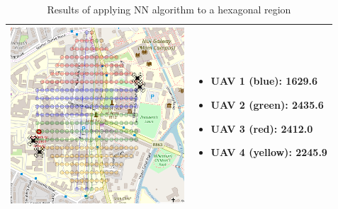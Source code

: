 \begin{table}[h!]
\begin{tabular}{ | c | m{5cm} | }
    \begin{minipage}[c][68mm][c]{.6\textwidth}
      \includegraphics[width=\linewidth, height=66mm]{Chapters/MultiAgentCoverage/MultipleTravellingSalesman/Figs/Hexagon/FourRAV.PNG}
    \end{minipage}
    &
    \begin{itemize}[leftmargin=*]
    \item[] UAV 1 (blue): 1629.6
    \item[] UAV 2 (green): 2435.6
    \item[] UAV 3 (red): 2412.0
    \item[] UAV 4 (yellow): 2245.9
    \end{itemize}
    \\
    \hline
  \end{tabular}
  \caption{Results of applying NN algorithm to a hexagonal region}\label{table:NNAlgoResultsHex}
\end{table}


